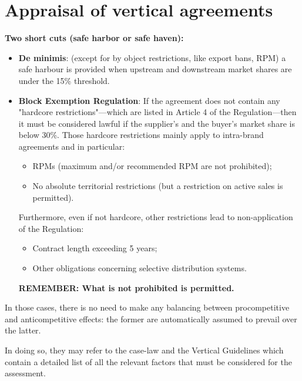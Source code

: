 \newpage

\section{Appraisal of vertical agreements}

    \textbf{Two short cuts (safe harbor or safe haven):}
    
    \begin{itemize}
        \item \textbf{De minimis}: (except for by object restrictions, like export bans, RPM) a safe harbour is provided when upstream and downstream market shares are under the 15\% threshold.
        \item \textbf{Block Exemption Regulation}: If the agreement does not contain any "hardcore restrictions"---which are listed in Article 4 of the Regulation---then it must be considered lawful if the supplier’s and the buyer’s market share is below 30\%. Those hardcore restrictions mainly apply to intra-brand agreements and in particular:
        \begin{itemize}
            \item RPMs (maximum and/or recommended RPM are not prohibited);
            \item No absolute territorial restrictions (but a restriction on active sales is permitted).
        \end{itemize}
        Furthermore, even if not hardcore, other restrictions lead to non-application of the Regulation:
        \begin{itemize}
            \item Contract length exceeding 5 years;
            \item Other obligations concerning selective distribution systems.
        \end{itemize}
        \textbf{REMEMBER: What is not prohibited is permitted.}
    \end{itemize}
    
    In those cases, there is no need to make any balancing between procompetitive and anticompetitive effects: the former are automatically assumed to prevail over the latter.

    
    In doing so, they may refer to the case-law and the Vertical Guidelines which contain a detailed list of all the relevant factors that must be considered for the assessment.

